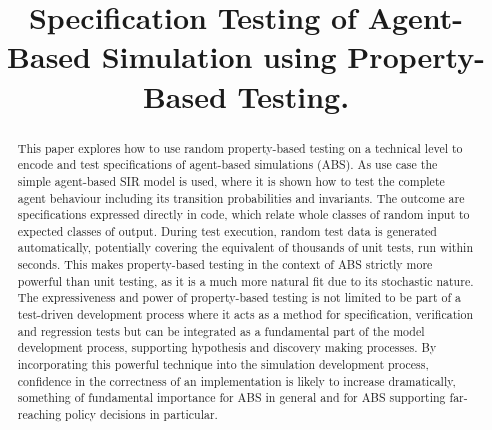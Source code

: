 \documentclass[]{interact}
\theoremstyle{plain}%
\theoremstyle{definition}
\theoremstyle{remark}
\begin{document}

\title{Specification Testing of Agent-Based Simulation using Property-Based Testing.}

\author{
}

\maketitle

\begin{abstract}
This paper explores how to use random property-based testing on a technical level to encode and test specifications of agent-based simulations (ABS). As use case the simple agent-based SIR model is used, where it is shown how to test the complete agent behaviour including its transition probabilities and invariants. The outcome are specifications expressed directly in code, which relate whole classes of random input to expected classes of output. During test execution, random test data is generated automatically, potentially covering the equivalent of thousands of unit tests, run within seconds. This makes property-based testing in the context of ABS strictly more powerful than unit testing, as it is a much more natural fit due to its stochastic nature. The expressiveness and power of property-based testing is not limited to be part of a test-driven development process where it acts as a method for specification, verification and regression tests but can be integrated as a fundamental part of the model development process, supporting hypothesis and discovery making processes. By incorporating this powerful technique into the simulation development process, confidence in the correctness of an implementation is likely to increase dramatically, something of fundamental importance for ABS in general and for ABS supporting far-reaching policy decisions in particular.
\end{abstract}
\end{document}
